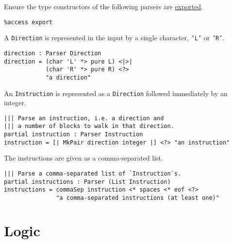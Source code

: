 Ensure the type constructors of the following parsers are
\href{http://docs.idris-lang.org/en/latest/tutorial/modules.html\#meaning-for-data-types}{exported}.

\begin{verbatim}
%access export
\end{verbatim}

A \texttt{Direction} is represented in the input by a
single character, \texttt{'L'} or
\texttt{'R'}.

\begin{verbatim}
direction : Parser Direction
direction = (char 'L' *> pure L) <|>|
            (char 'R' *> pure R) <?>
            "a direction"
\end{verbatim}

An \texttt{Instruction} is represented as a
\texttt{Direction} followed immediately by an integer.

\begin{verbatim}
||| Parse an instruction, i.e. a direction and
||| a number of blocks to walk in that direction.
partial instruction : Parser Instruction
instruction = [| MkPair direction integer |] <?> "an instruction"
\end{verbatim}

The instructions are given as a comma-separated list.

\begin{verbatim}
||| Parse a comma-separated list of `Instruction`s.
partial instructions : Parser (List Instruction)
instructions = commaSep instruction <* spaces <* eof <?>
               "a comma-separated instructions (at least one)"
\end{verbatim}

\newpage

\section{Logic}\label{logic}

